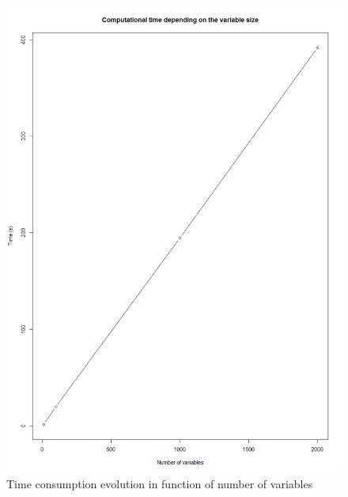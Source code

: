 \documentclass[twocolumn]{article}
\begin{document}
\begin{figure}[!]
    \centering
    \includegraphics[scale=0.3]{img/VarTime.png}
    \caption{Time consumption evolution in function of number of variables}
    \label{fig:tpsVar}
\end{figure}
\end{document}
